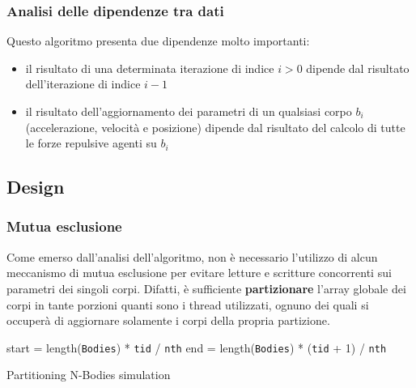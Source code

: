 \documentclass[12pt,a4paper,oneside]{article}
\begin{document}
	\subsubsection{Analisi delle dipendenze tra dati}
	\label{sec:dipendenze}
	Questo algoritmo presenta due dipendenze molto importanti:
	\begin{itemize}
		\item il risultato di una determinata iterazione di indice $i > 0$ dipende dal risultato dell'iterazione di indice $i-1$
		\item il risultato dell'aggiornamento dei parametri di un qualsiasi corpo $b_i$ (accelerazione, velocità e posizione) dipende dal risultato del calcolo di tutte le forze repulsive agenti su $b_i$
	\end{itemize}
	
	\subsection{Design}
	\subsubsection{Mutua esclusione}
	Come emerso dall'analisi dell'algoritmo, non è necessario l'utilizzo di alcun meccanismo di mutua esclusione per evitare letture e scritture concorrenti sui parametri dei singoli corpi. Difatti, è sufficiente \textbf{partizionare} l'array globale dei corpi in tante porzioni quanti sono i thread utilizzati, ognuno dei quali si occuperà di aggiornare solamente i corpi della propria partizione.
	
	\begin{algorithm}
		
		start = length(\texttt{Bodies}) * \texttt{tid} / \texttt{nth}\;
		end = length(\texttt{Bodies}) * (\texttt{tid} + 1) / \texttt{nth}\;
		\caption{Partitioning N-Bodies simulation}
		\label{alg:sim-partition}
	\end{algorithm}
	
\end{document}
